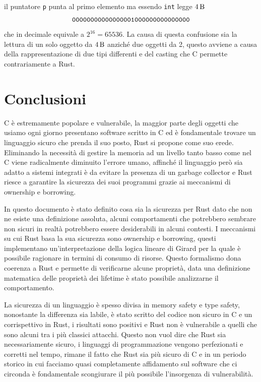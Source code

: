 \documentclass[Lau,binding=0.6cm]{sapthesis}
\newcommand{\textcode}[1]{\colorbox{backcolour}{\texttt{#1}}}
\begin{document}
il puntatore \texttt{p} punta al primo elemento ma essendo \textcode{int} legge $ \SI{4}{\byte} $  
\[
\texttt{00000000000000001000000000000000} \\
\]
che in decimale equivale a $ 2^{16} = 65536 $. La causa di questa confusione sia la lettura di un solo oggetto da $\SI{4}{\byte} $ anziché due oggetti da 2, questo avviene a causa della rappresentazione di due tipi differenti e del casting che C permette contrariamente a Rust.




%
%


\chapter{Conclusioni}
C è estremamente popolare e vulnerabile, la maggior parte degli oggetti che usiamo ogni giorno presentano software scritto in C ed è fondamentale trovare un linguaggio sicuro che prenda il suo posto, Rust si propone come suo erede.
Eliminando la necessità di gestire la memoria ad un livello tanto basso come nel C viene radicalmente diminuito l'errore umano, affinché il linguaggio però sia adatto a sistemi integrati è da evitare la presenza di un garbage collector e Rust riesce a garantire la sicurezza dei suoi programmi grazie ai meccanismi di ownership e borrowing. 

In questo documento è stato definito cosa sia la sicurezza per Rust dato che non ne esiste una definizione assoluta, alcuni comportamenti che potrebbero sembrare non sicuri in realtà potrebbero essere desiderabili in alcuni contesti.
I meccanismi su cui Rust basa la sua sicurezza sono ownership e borrowing, questi implementano un'interpretazione della logica lineare di Girard per la quale è possibile ragionare in termini di consumo di risorse.
Questo formalismo dona coerenza a Rust e permette di verificarne alcune proprietà, data una definizione matematica delle proprietà dei lifetime è stato possibile analizzarne il comportamento.

La sicurezza di un linguaggio è spesso divisa in memory safety e type safety, nonostante la differenza sia labile, è stato scritto del codice non sicuro in C e un corrispettivo in Rust, i risultati sono positivi e Rust non è vulnerabile a quelli che sono alcuni tra i più classici attacchi.
Questo non vuol dire che Rust sia necessariamente sicuro, i linguaggi di programmazione vengono perfezionati e corretti nel tempo, rimane il fatto che Rust sia più sicuro di C e in un periodo storico in cui facciamo quasi completamente affidamento sul software che ci circonda è fondamentale scongiurare il più possibile l'insorgenza di vulnerabilità. 
\end{document}
